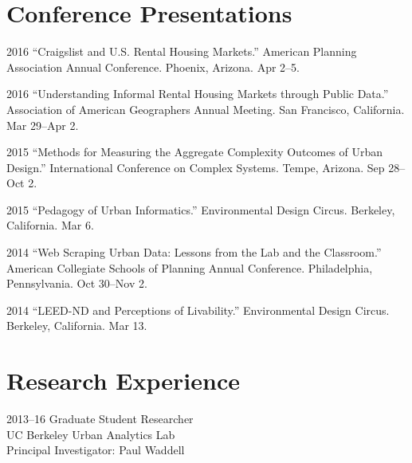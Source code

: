 \documentclass{academiccv}
\begin{document}
\section*{Conference Presentations}

\begin{tablist}

\item[2016] \tab \enquote{Craigslist and U.S. Rental Housing Markets.} American Planning Association Annual Conference. Phoenix, Arizona. Apr 2--5.

\item[2016] \tab \enquote{Understanding Informal Rental Housing Markets through Public Data.} Association of American Geographers Annual Meeting. San Francisco, California. Mar 29--Apr 2.

\item[2015] \tab \enquote{Methods for Measuring the Aggregate Complexity Outcomes of Urban Design.} International Conference on Complex Systems. Tempe, Arizona. Sep 28--Oct 2.

\item[2015] \tab \enquote{Pedagogy of Urban Informatics.} Environmental Design Circus. Berkeley, California. Mar 6.

\item[2014] \tab \enquote{Web Scraping Urban Data: Lessons from the Lab and the Classroom.} American Collegiate Schools of Planning Annual Conference. Philadelphia, Pennsylvania. Oct 30--Nov 2.

\item[2014] \tab \enquote{LEED-ND and Perceptions of Livability.} Environmental Design Circus. Berkeley, California. Mar 13.

\end{tablist}



\section*{Research Experience}

\begin{tablist}
\item[2013--16] \tab Graduate Student Researcher \\
                     UC Berkeley Urban Analytics Lab \\
                     Principal Investigator: Paul Waddell
\end{tablist}
\end{document}
